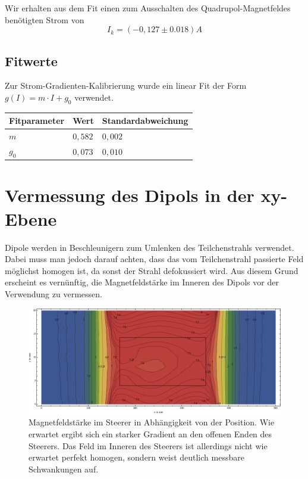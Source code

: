 \documentclass[bigchapter,colorback,accentcolor=tud4b,linedtoc,11pt]{tudreport}
\begin{document}
Wir erhalten aus dem Fit einen zum Ausschalten des Quadrupol-Magnetfeldes benötigten Strom von $$I_k=(-0,127 \pm 0.018)A$$
\subsection{Fitwerte}

Zur Strom-Gradienten-Kalibrierung wurde ein linear Fit der Form $g(I) = m \cdot I + g_0$ verwendet.
\begin{center}
  \begin{tabular}{|p{2.6cm}|p{2.6cm}|p{3.5cm}|}
    \hline
    Fitparameter & Wert    & Standardabweichung \\ \hline
    $m$          & $0,582$ & $0,002$            \\ \hline
    $g_0$        & $0,073$ & $0,010$            \\ \hline
	\end{tabular}
\end{center}

\clearpage{}
\section{Vermessung des Dipols in der xy-Ebene}

Dipole werden in Beschleunigern zum Umlenken des Teilchenstrahls verwendet. Dabei muss man jedoch darauf achten, dass das vom Teilchenstrahl passierte Feld möglichst homogen ist, da sonst der Strahl defokussiert wird. Aus diesem Grund erscheint es vernünftig, die Magnetfeldstärke im Inneren des Dipols vor der Verwendung zu vermessen.

\begin{figure}[H]
\centering
\includegraphics[width=1\textwidth]{img/steererxy.png}
\caption{Magnetfeldstärke im Steerer in Abhängigkeit von der Position. Wie erwartet ergibt sich ein starker Gradient an den offenen Enden des Steerers. Das Feld im Inneren des Steerers ist allerdings nicht wie erwartet perfekt homogen, sondern weist deutlich messbare Schwankungen auf.}
\end{figure}
\end{document}
